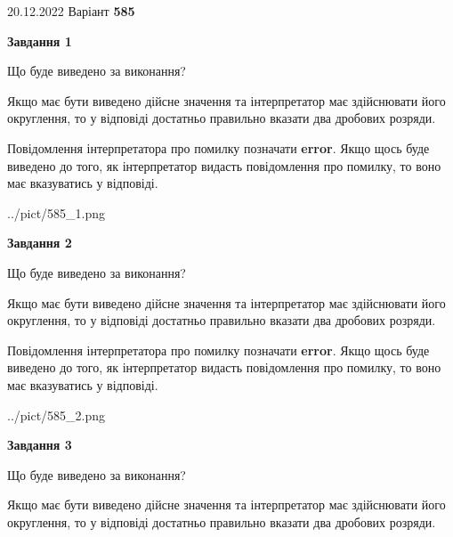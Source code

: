 \documentclass[12pt, ukrainian]{article}
\begin{document}
{20.12.2022 Варіант \No \textbf { 585 }\par}
{
\begin {Large}

{\begin {center}\textbf{Завдання 1}\end {center}}\par
Що буде виведено за виконання? \par

Якщо має бути виведено дійсне значення та інтерпретатор має здійснювати його округлення, 
то у відповіді достатньо правильно вказати два дробових розряди.

Повідомлення інтерпретатора про помилку позначати \textbf{error}.
Якщо щось буде виведено до того, як інтерпретатор видасть повідомлення про помилку, 
то воно має вказуватись у відповіді. \par

\begin{center}
	{../pict/585_1.png}
\end{center}
\newpage

{\begin {center}\textbf{Завдання 2}\end {center}}\par
Що буде виведено за виконання? \par

Якщо має бути виведено дійсне значення та інтерпретатор має здійснювати його округлення, 
то у відповіді достатньо правильно вказати два дробових розряди.

Повідомлення інтерпретатора про помилку позначати \textbf{error}.
Якщо щось буде виведено до того, як інтерпретатор видасть повідомлення про помилку, 
то воно має вказуватись у відповіді. \par

\begin{center}
	{../pict/585_2.png}
\end{center}
\newpage

{\begin {center}\textbf{Завдання 3}\end {center}}\par
Що буде виведено за виконання? \par

Якщо має бути виведено дійсне значення та інтерпретатор має здійснювати його округлення, 
то у відповіді достатньо правильно вказати два дробових розряди.


\end{Large}}
\end{document}
